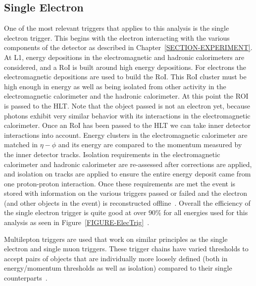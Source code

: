 


\subsection{Single Electron}
\label{SECTION-TRIGGERS-1e}

One of the most relevant triggers that applies to this analysis is the single electron trigger. This begins with the electron interacting with the various components of the detector as described in Chapter~\ref{SECTION-EXPERIMENT}. At L1, energy depositions in the electromagnetic and hadronic calorimeters are considered, and a RoI is built around high energy depositions. For electrons the electromagnetic depositions are used to build the RoI. This RoI cluster must be high enough in energy as well as being isolated from other activity in the electromagnetic calorimeter and the hadronic calorimeter. At this point the ROI is passed to the HLT. Note that the object passed is not an electron yet, because photons exhibit very similar behavior with its interactions in the electromagnetic calorimeter. Once an RoI has been passed to the HLT we can take inner detector interactions into account. Energy clusters in the electromagnetic calorimeter are matched in $\eta-\phi$ and its energy are compared to the momentum measured by the inner detector tracks. Isolation requirements in the electromagnetic calorimeter and hadronic calorimeter are re-assessed after corrections are applied, and isolation on tracks are applied to ensure the entire energy deposit came from one proton-proton interaction. Once these requirements are met the event is stored with information on the various triggers passed or failed and the electron (and other objects in the event) is reconstructed offline~\cite{TrigProposal}. Overall the efficiency of the single electron trigger is quite good at over 90\% for all energies used for this analysis as seen in Figure~\ref{FIGURE-ElecTrig}~\cite{Backes:2200359}. 



Multilepton triggers are used that work on similar principles as the single electron and single muon triggers. These trigger chains have varied thresholds to accept pairs of objects that are individually more loosely defined (both in energy/momentum thresholds as well as isolation) compared to their single counterparts~\cite{ATLASTDAQ}.
